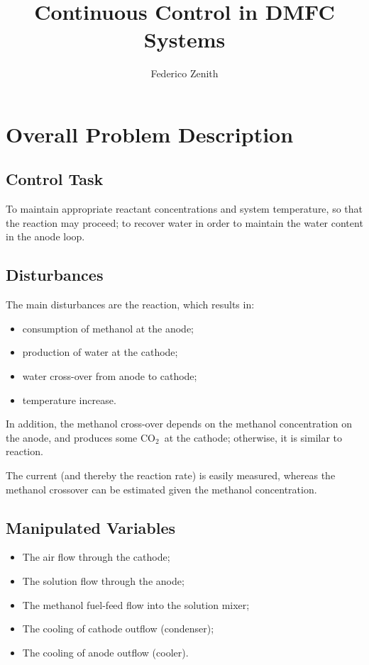 \documentclass[a4paper,10pt]{article}
\title{Continuous Control in DMFC Systems}
\author{Federico Zenith}
\newcommand{\COO}{\ensuremath{\mathrm{CO_2}}}
\begin{document}
\maketitle

\section{Overall Problem Description}

\subsection{Control Task}
To maintain appropriate reactant concentrations and system temperature, so that
the reaction may proceed; to recover water in order to maintain the water
content in the anode loop.

\subsection{Disturbances}
The main disturbances are the reaction, which results in:
\begin{itemize}
\item consumption of methanol at the anode;
\item production of water at the cathode;
\item water cross-over from anode to cathode;
\item temperature increase.
\end{itemize}

In addition, the methanol cross-over depends on the methanol concentration on
the anode, and produces some \COO\ at the cathode; otherwise, it is similar to
reaction.

The current (and thereby the reaction rate) is easily measured, whereas the
methanol crossover can be estimated given the methanol concentration.

\subsection{Manipulated Variables}
\begin{itemize}
\item The air flow through the cathode;
\item The solution flow through the anode;
\item The methanol fuel-feed flow into the solution mixer;
\item The cooling of cathode outflow (condenser);
\item The cooling of anode outflow (cooler).
\end{itemize}
\end{document}
